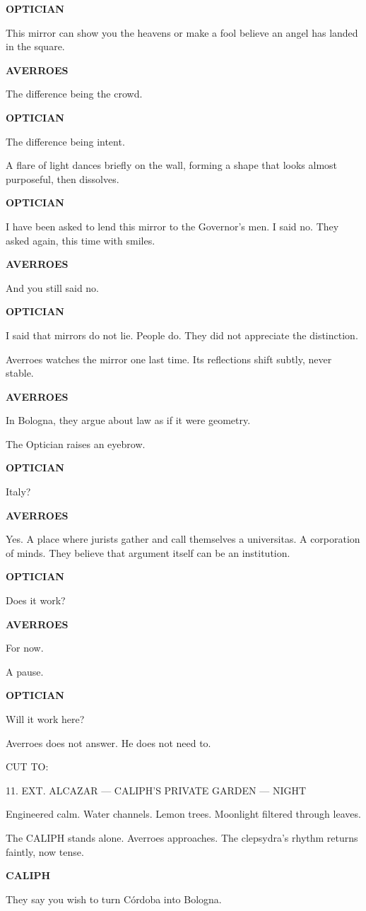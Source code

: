 \documentclass[12pt]{article}
\newlength{\charindent}
\newlength{\dialogueindent}
\newlength{\dialoguewidth}
\newlength{\transitionindent}
\newcommand{\slug}[1]{\vspace{1.25em}\textsc{#1}\vspace{0.5em}}
\newcommand{\action}[1]{#1}
\newcommand{\character}[1]{%
  \par\vspace{0.75em}%
  \hspace*{\charindent}\textbf{#1}%
}
\newcommand{\dialogue}[1]{%
  \par\nobreak
  \hspace*{\dialogueindent}%
  \begin{minipage}[t]{\dialoguewidth}
  #1
  \end{minipage}
}
\newcommand{\transition}[1]{%
  \par\vspace{1em}%
  \hspace*{\transitionindent}\textsc{#1}%
}
\begin{document}
\character{OPTICIAN}
\dialogue{This mirror can show you the heavens or make a fool believe an angel has landed in the square.}

\character{AVERROES}
\dialogue{The difference being the crowd.}

\character{OPTICIAN}
\dialogue{The difference being intent.}

\action{A flare of light dances briefly on the wall, forming a shape that looks almost purposeful, then dissolves.}

\character{OPTICIAN}
\dialogue{I have been asked to lend this mirror to the Governor's men. I said no. They asked again, this time with smiles.}

\character{AVERROES}
\dialogue{And you still said no.}

\character{OPTICIAN}
\dialogue{I said that mirrors do not lie. People do. They did not appreciate the distinction.}

\action{Averroes watches the mirror one last time. Its reflections shift subtly, never stable.}

\character{AVERROES}
\dialogue{In Bologna, they argue about law as if it were geometry.}

\action{The Optician raises an eyebrow.}

\character{OPTICIAN}
\dialogue{Italy?}

\character{AVERROES}
\dialogue{Yes. A place where jurists gather and call themselves a universitas. A corporation of minds. They believe that argument itself can be an institution.}

\character{OPTICIAN}
\dialogue{Does it work?}

\character{AVERROES}
\dialogue{For now.}

\action{A pause.}

\character{OPTICIAN}
\dialogue{Will it work here?}

\action{Averroes does not answer. He does not need to.}

\transition{CUT TO:}

\slug{11. EXT. ALCAZAR --- CALIPH'S PRIVATE GARDEN --- NIGHT}

\action{Engineered calm. Water channels. Lemon trees. Moonlight filtered through leaves.}

\action{The CALIPH stands alone. Averroes approaches. The clepsydra's rhythm returns faintly, now tense.}

\character{CALIPH}
\dialogue{They say you wish to turn Córdoba into Bologna.}
\end{document}
